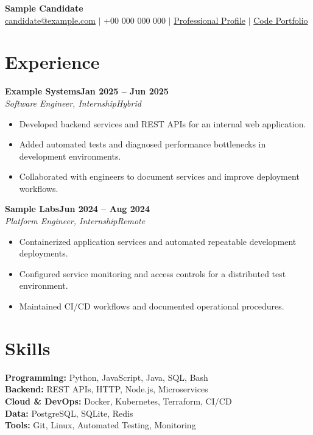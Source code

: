 \documentclass[10pt,a4paper]{article}
\newcommand{\resumeRole}[4]{%
  \textbf{#1}\hfill\textbf{#2}\\[-1pt]
  \textit{#3}\hfill\textit{#4}\par\vspace{-2pt}
}
\newcommand{\resumeBulletsStart}{\begin{itemize}}
\newcommand{\resumeBulletsEnd}{\end{itemize}\vspace{2pt}}
\begin{document}
\begin{center}
  {\LARGE\bfseries Sample Candidate}\\[3pt]
  \href{mailto:candidate@example.com}{candidate@example.com} $\vert$
  +00 000 000 000 $\vert$
  \href{https://example.com/profile}{Professional Profile} $\vert$
  \href{https://example.com/code}{Code Portfolio}
\end{center}
\vspace{-9pt}

\section*{Experience}
\resumeRole{Example Systems}{Jan 2025 -- Jun 2025}{Software Engineer, Internship}{Hybrid}
\resumeBulletsStart
  \item Developed backend services and REST APIs for an internal web application.
  \item Added automated tests and diagnosed performance bottlenecks in development environments.
  \item Collaborated with engineers to document services and improve deployment workflows.
\resumeBulletsEnd

\resumeRole{Sample Labs}{Jun 2024 -- Aug 2024}{Platform Engineer, Internship}{Remote}
\resumeBulletsStart
  \item Containerized application services and automated repeatable development deployments.
  \item Configured service monitoring and access controls for a distributed test environment.
  \item Maintained CI/CD workflows and documented operational procedures.
\resumeBulletsEnd

\section*{Skills}
\textbf{Programming:} Python, JavaScript, Java, SQL, Bash\\
\textbf{Backend:} REST APIs, HTTP, Node.js, Microservices\\
\textbf{Cloud \& DevOps:} Docker, Kubernetes, Terraform, CI/CD\\
\textbf{Data:} PostgreSQL, SQLite, Redis\\
\textbf{Tools:} Git, Linux, Automated Testing, Monitoring

\end{document}
